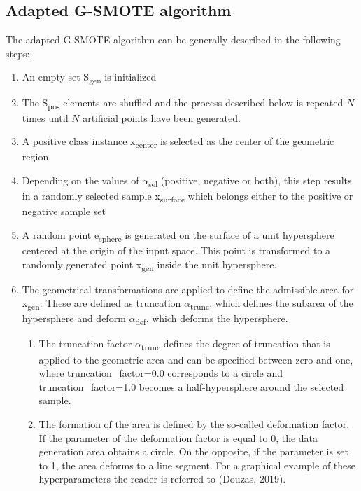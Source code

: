 \documentclass[parskip=full]{scrartcl}
\begin{document}

\subsection{Adapted G-SMOTE algorithm}

The adapted G-SMOTE algorithm can be generally described in the following steps:

\begin{enumerate}
	\item 
	An empty set S\textsubscript{gen} is initialized
	\item 
	The S\textsubscript{pos} elements are shuffled and the process described below is repeated $\mathit{N}$ times until $\mathit{N}$ artificial points have been generated.
	\item 
	A positive class instance x\textsubscript{center} is selected as the center of the geometric region.
	\item 
	Depending on the values of $\alpha$\textsubscript{sel} (positive, negative or both), this step results in a randomly selected sample x\textsubscript{surface} which belongs either to the positive or negative sample set
	\item 
	A random point e\textsubscript{sphere} is generated on the surface of a unit hypersphere centered at the origin of the input space. This point is transformed to a randomly generated point x\textsubscript{gen} inside the unit hypersphere. 
	\item 
	The geometrical transformations are applied to define the admissible area for x\textsubscript{gen}. These are defined as truncation $\alpha$\textsubscript{trunc}, which defines the subarea of the hypersphere and deform $\alpha$\textsubscript{def}, which deforms the hypersphere. 
	
	\begin{enumerate}[label=($\alph*$)]
		\item 
		The truncation factor $\alpha$\textsubscript{trunc} defines the degree of truncation that is applied to the geometric area and can be specified between zero and one, where truncation\_factor=0.0 corresponds to a circle and truncation\_factor=1.0 becomes a half-hypersphere around the selected sample. 
		
		\item 
		The formation of the area is defined by the so-called deformation factor. If the parameter of the deformation factor is equal to 0, the data generation area obtains a circle. On the opposite, if the parameter is set to 1, the area deforms to a line segment. 
		For a graphical example of these hyperparameters the reader is referred to (Douzas, 2019).
	\end{enumerate}


\end{enumerate}
\end{document}
